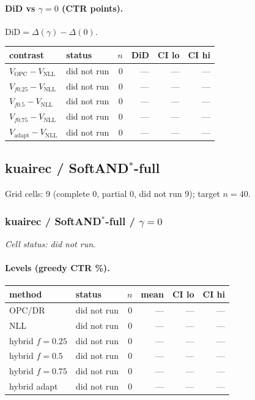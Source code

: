\documentclass[10pt,a4paper]{article}
\begin{document}
\paragraph{DiD vs $\gamma=0$ (CTR points).} $\mathrm{DiD}=\Delta(\gamma)-\Delta(0)$.
{\centering\small\begin{tabular}{llrrrr}
\toprule contrast & status & $n$ & DiD & CI lo & CI hi \\
\midrule
$V_{\mathrm{OPC}}-V_{\mathrm{NLL}}$ & did not run & 0 & --- & --- & --- \\
$V_{f0.25}-V_{\mathrm{NLL}}$ & did not run & 0 & --- & --- & --- \\
$V_{f0.5}-V_{\mathrm{NLL}}$ & did not run & 0 & --- & --- & --- \\
$V_{f0.75}-V_{\mathrm{NLL}}$ & did not run & 0 & --- & --- & --- \\
$V_{\mathrm{adapt}}-V_{\mathrm{NLL}}$ & did not run & 0 & --- & --- & --- \\
\bottomrule\end{tabular}\par}
\bigskip
\newpage
\subsection{kuairec / SoftAND$^*$-full}
Grid cells: 9 (complete 0, partial 0, did not run 9); target $n=40$.
\subsubsection{kuairec / SoftAND$^*$-full / $\gamma=0$}
\emph{Cell status: did not run}.
\paragraph{Levels (greedy CTR \%).}
{\centering\small\begin{tabular}{llrrrr}
\toprule method & status & $n$ & mean & CI lo & CI hi \\
\midrule
OPC/DR & did not run & 0 & --- & --- & --- \\
NLL & did not run & 0 & --- & --- & --- \\
hybrid $f{=}0.25$ & did not run & 0 & --- & --- & --- \\
hybrid $f{=}0.5$ & did not run & 0 & --- & --- & --- \\
hybrid $f{=}0.75$ & did not run & 0 & --- & --- & --- \\
hybrid adapt & did not run & 0 & --- & --- & --- \\
\bottomrule\end{tabular}\par}
\end{document}
